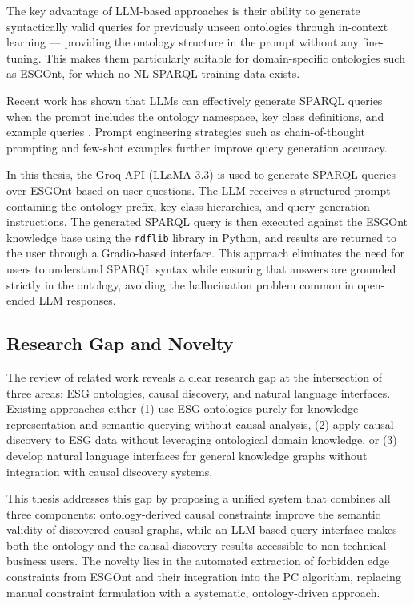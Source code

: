\documentclass[a4paper,11pt,oneside]{article}
\begin{document}
The key advantage of LLM-based approaches is their ability to generate syntactically valid queries for previously unseen ontologies through in-context learning — providing the ontology structure in the prompt without any fine-tuning. This makes them particularly suitable for domain-specific ontologies such as ESGOnt, for which no NL-SPARQL training data exists.

Recent work has shown that LLMs can effectively generate SPARQL queries when the prompt includes the ontology namespace, key class definitions, and example queries \cite{omar2023}. Prompt engineering strategies such as chain-of-thought prompting and few-shot examples further improve query generation accuracy.

In this thesis, the Groq API (LLaMA 3.3) is used to generate SPARQL queries over ESGOnt based on user questions. The LLM receives a structured prompt containing the ontology prefix, key class hierarchies, and query generation instructions. The generated SPARQL query is then executed against the ESGOnt knowledge base using the \texttt{rdflib} library in Python, and results are returned to the user through a Gradio-based interface. This approach eliminates the need for users to understand SPARQL syntax while ensuring that answers are grounded strictly in the ontology, avoiding the hallucination problem common in open-ended LLM responses.

\subsection{Research Gap and Novelty}

The review of related work reveals a clear research gap at the intersection of three areas: ESG ontologies, causal discovery, and natural language interfaces. Existing approaches either (1) use ESG ontologies purely for knowledge representation and semantic querying without causal analysis, (2) apply causal discovery to ESG data without leveraging ontological domain knowledge, or (3) develop natural language interfaces for general knowledge graphs without integration with causal discovery systems.

This thesis addresses this gap by proposing a unified system that combines all three components: ontology-derived causal constraints improve the semantic validity of discovered causal graphs, while an LLM-based query interface makes both the ontology and the causal discovery results accessible to non-technical business users. The novelty lies in the automated extraction of forbidden edge constraints from ESGOnt and their integration into the PC algorithm, replacing manual constraint formulation with a systematic, ontology-driven approach.
\end{document}
